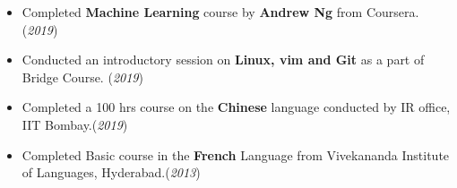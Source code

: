 \documentclass[10pt]{article}
\begin{document}
\colorbox{bl}{}
\vspace{-0.58cm}
\begin{itemize}[leftmargin=0.4cm]
    \item { Completed \textbf{Machine Learning} course by \textbf{Andrew Ng} from Coursera. }\hfill{(\textit{2019})}\vspace{-0.2cm}
        \item {Conducted an introductory session on \textbf{Linux, vim and Git} as a part of Bridge Course. }\hfill{(\textit{2019})}\vspace{-0.2cm}
    \item {Completed a 100 hrs course on the \textbf{Chinese} language conducted by IR office, IIT Bombay.}\hfill{(\textit{2019})}\vspace{-0.2cm}
    \item {Completed Basic course in the \textbf{French} Language from Vivekananda Institute of Languages, Hyderabad.}\hfill{(\textit{2013})}\vspace{-0.2cm}
\end{itemize}

\end{document}
